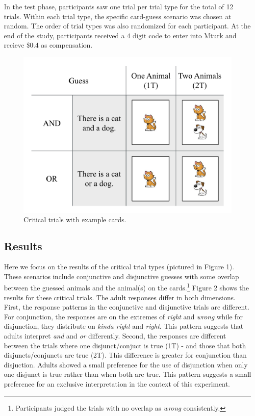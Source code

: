 \documentclass[10pt, letterpaper]{article}
\newenvironment{CodeChunk}{}{}
\begin{document}
In the test phase, participants saw one trial per trial type for the
total of 12 trials. Within each trial type, the specific card-guess
scenario was chosen at random. The order of trial types was also
randomized for each participant. At the end of the study, participants
received a 4 digit code to enter into Mturk and recieve \$0.4 as
compensation.

\begin{CodeChunk}
\captionsetup{width=0.8\columnwidth}\begin{figure}[t]

{\centering \includegraphics{figs/critical-1} 

}

\caption[Critical trials with example cards]{Critical trials with example cards.}\label{fig:critical}
\end{figure}
\end{CodeChunk}

\subsection{Results}\label{results}

Here we focus on the results of the critical trial types (pictured in
Figure 1). These scenarios include conjunctive and disjunctive guesses
with some overlap between the guessed animals and the animal(s) on the
cards.\footnote{Participants judged the trials with no overlap as \textit{wrong} consistently.}
Figure 2 shows the results for these critical trials. The adult
responses differ in both dimensions. First, the response patterns in the
conjunctive and disjunctive trials are different. For conjunction, the
responses are on the extremes of \emph{right} and \emph{wrong} while for
disjunction, they distribute on \emph{kinda right} and \emph{right}.
This pattern suggests that adults interpret \emph{and} and \emph{or}
differently. Second, the responses are different between the trials
where one disjunct/conjuct is true (1T) - and those that both
disjuncts/conjuncts are true (2T). This difference is greater for
conjunction than disjuction. Adults showed a small preference for the
use of disjunction when only one disjunct is true rather than when both
are true. This pattern suggests a small preference for an exclusive
interpretation in the context of this experiment.
\end{document}
